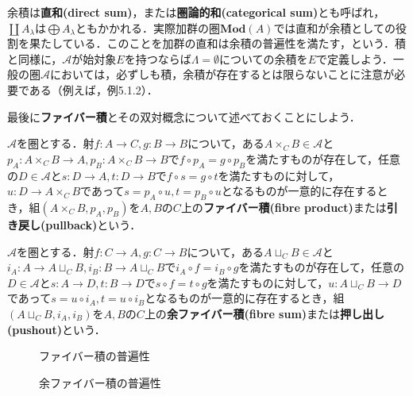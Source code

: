 余積は\textbf{直和(direct sum)}，または\textbf{圏論的和(categorical sum)}とも呼ばれ，$\coprod A_\lambda$は$\bigoplus A_\lambda$ともかかれる．実際加群の圏$\mathbf{Mod}(A)$では直和が余積としての役割を果たしている．このことを加群の直和は余積の普遍性を満たす，という．積と同様に，$\mathscr{A}$が始対象$E$を持つならば$\Lambda=\emptyset$についての余積を$E$で定義しよう．一般の圏$\mathscr{A}$においては，必ずしも積，余積が存在するとは限らないことに注意が必要である（例えば\cite{Leinster2014}，例5.1.2）．

最後に\textbf{ファイバー積}とその双対概念について述べておくことにしよう．

\begin{defi}[ファイバー積]
	$\mathscr{A}$を圏とする．射$f:A\to C, g:B\to B$について，ある$A\times_C B\in\mathscr{A}$と$p_A:A\times_CB\to A, p_B:A\times_CB\to B$で$f\circ p_A=g\circ p_B$を満たすものが存在して，任意の$D\in\mathscr{A}$と$s:D\to A, t:D\to B$で$f\circ s=g\circ t$を満たすものに対して，$u:D\to A\times_CB$であって$s=p_A\circ u, t=p_B\circ u$となるものが一意的に存在するとき，組$(A\times_CB, p_A, p_B)$を$A,B$の$C$上の\textbf{ファイバー積(fibre product)}または\textbf{引き戻し(pullback)}という．
\end{defi}

\begin{defi}[余ファイバー積]
	$\mathscr{A}$を圏とする．射$f:C\to A, g:C\to B$について，ある$A\sqcup_C B\in\mathscr{A}$と$i_A:A\to A\sqcup_C B, i_B:B\to A\sqcup_C B$で$i_A\circ f=i_B\circ g$を満たすものが存在して，任意の$D\in\mathscr{A}$と$s:A\to D, t:B\to D$で$s\circ f=t\circ g$を満たすものに対して，$u:A\sqcup_C B\to D$であって$s=u\circ i_A, t=u\circ i_B$となるものが一意的に存在するとき，組$(A\sqcup_C B, i_A, i_B)$を$A,B$の$C$上の\textbf{余ファイバー積(fibre sum)}または\textbf{押し出し(pushout)}という．
\end{defi}

\begin{minipage}{.45\textwidth}
	\begin{figure}[H]
		\centering
		\caption{ファイバー積の普遍性}
	\end{figure}
\end{minipage}
\hfill
\begin{minipage}{.45\textwidth}
	\begin{figure}[H]
		\centering
		\caption{余ファイバー積の普遍性}
	\end{figure}
\end{minipage}

